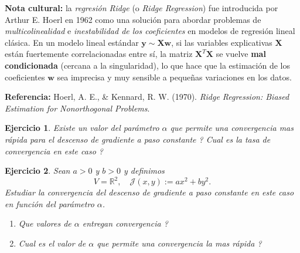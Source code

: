 \documentclass[11pt]{report}
\newtheorem{ex}{Ejercicio}
\begin{document}
\footnotesize
\textbf{Nota cultural:}
la \emph{regresión Ridge} (o \emph{Ridge Regression}) fue introducida por Arthur E. Hoerl en 1962 como una solución para abordar problemas de \emph{multicolinealidad} e \emph{inestabilidad de los coeficientes} en modelos de regresión lineal clásica.
%
En un modelo lineal estándar
$\mathbf{y} \sim \mathbf{X}\mathbf{w}$, si las variables explicativas $\mathbf{X}$ están fuertemente correlacionadas entre sí, la matriz $\mathbf{X}^T \mathbf{X}$ se vuelve \textbf{mal condicionada} (cercana a la singularidad), lo que hace que la estimación de los coeficientes $\mathbf{w}$ sea {imprecisa y muy sensible} a pequeñas variaciones en los datos.

\medskip

\noindent \textbf{Referencia:}
Hoerl, A. E., \& Kennard, R. W. (1970). \textit{Ridge Regression: Biased Estimation for Nonorthogonal Problems}.

\normalsize

\begin{ex}
Existe un valor del parámetro $\alpha $ que permite una convergencia mas rápida para el descenso de gradiente a paso constante ? Cual es la tasa de convergencia en este caso ?
\end{ex}


\begin{ex}
Sean $a > 0$ y $b > 0$ y definimos
\[
V = \mathbb{R}^2, \quad \mathcal{J}(x,y) := a x^2 + b y^2.
\]
Estudiar la convergencia del descenso de gradiente a paso constante en este caso en función del parámetro $\alpha$.

\begin{enumerate}
    \item Que valores de $\alpha$ entregan convergencia ?
    \item Cual es el valor de $\alpha$ que permite una convergencia la mas rápida ?
\end{enumerate}
\end{ex}
\end{document}
